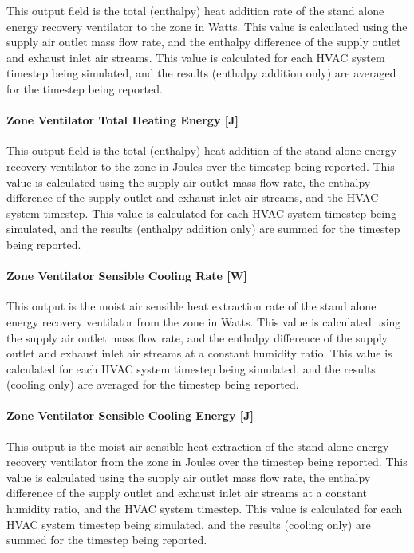 This output field is the total (enthalpy) heat addition rate of the stand alone energy recovery ventilator to the zone in Watts. This value is calculated using the supply air outlet mass flow rate, and the enthalpy difference of the supply outlet and exhaust inlet air streams. This value is calculated for each HVAC system timestep being simulated, and the results (enthalpy addition only) are averaged for the timestep being reported.

\paragraph{Zone Ventilator Total Heating Energy {[}J{]}}\label{zone-ventilator-total-heating-energy-j}

This output field is the total (enthalpy) heat addition of the stand alone energy recovery ventilator to the zone in Joules over the timestep being reported. This value is calculated using the supply air outlet mass flow rate, the enthalpy difference of the supply outlet and exhaust inlet air streams, and the HVAC system timestep. This value is calculated for each HVAC system timestep being simulated, and the results (enthalpy addition only) are summed for the timestep being reported.

\paragraph{Zone Ventilator Sensible Cooling Rate {[}W{]}}\label{zone-ventilator-sensible-cooling-rate-w}

This output is the moist air sensible heat extraction rate of the stand alone energy recovery ventilator from the zone in Watts. This value is calculated using the supply air outlet mass flow rate, and the enthalpy difference of the supply outlet and exhaust inlet air streams at a constant humidity ratio. This value is calculated for each HVAC system timestep being simulated, and the results (cooling only) are averaged for the timestep being reported.

\paragraph{Zone Ventilator Sensible Cooling Energy {[}J{]}}\label{zone-ventilator-sensible-cooling-energy-j}

This output is the moist air sensible heat extraction of the stand alone energy recovery ventilator from the zone in Joules over the timestep being reported. This value is calculated using the supply air outlet mass flow rate, the enthalpy difference of the supply outlet and exhaust inlet air streams at a constant humidity ratio, and the HVAC system timestep. This value is calculated for each HVAC system timestep being simulated, and the results (cooling only) are summed for the timestep being reported.

